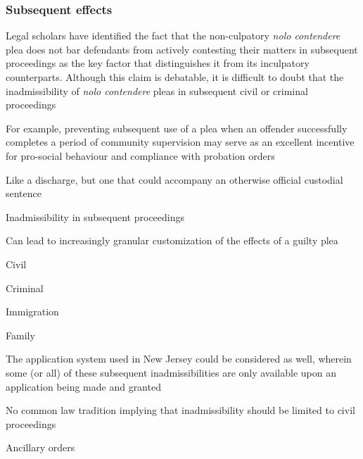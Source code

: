 \subsubsection{Subsequent effects}

Legal scholars have identified the fact that the non-culpatory \textit{nolo contendere} plea does not bar defendants from actively contesting their matters in subsequent proceedings as the key factor that distinguishes it from its inculpatory counterparts. Although this claim is debatable, it is difficult to doubt that the inadmissibility of \textit{nolo contendere} pleas in subsequent civil or criminal proceedings 

For example, preventing subsequent use of a plea when an offender successfully completes a period of community supervision may serve as an excellent incentive for pro-social behaviour and compliance with probation orders

Like a discharge, but one that could accompany an otherwise official custodial sentence

Inadmissibility in subsequent proceedings

Can lead to increasingly granular customization of the effects of a guilty plea

Civil

Criminal

Immigration

Family

The application system used in New Jersey could be considered as well, wherein some (or all) of these subsequent inadmissibilities are only available upon an application being made and granted

No common law tradition implying that inadmissibility should be limited to civil proceedings

Ancillary orders

